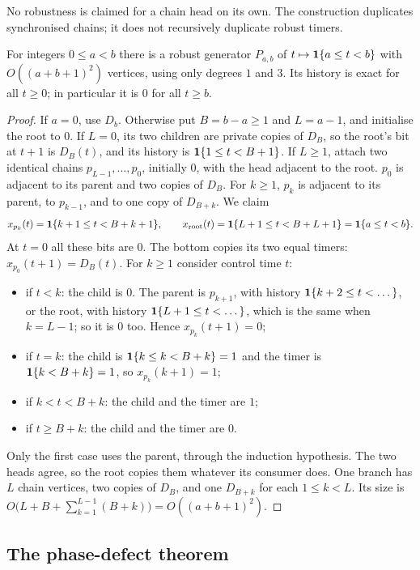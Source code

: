 No robustness is claimed for a chain head on its own. The construction duplicates synchronised
chains; it does not recursively duplicate robust timers.

\begin{lemma}[Pulses]\label{lem:pulses}
For integers $0\le a<b$ there is a robust generator $P_{a,b}$ of $t\mapsto\mathbf{1}\{a\le t<b\}$ with
$O((a+b+1)^2)$ vertices, using only degrees $1$ and $3$. Its history is exact for all $t\ge 0$; in
particular it is $0$ for all $t\ge b$.
\end{lemma}

\begin{proof}
If $a=0$, use $D_b$. Otherwise put $B=b-a\ge 1$ and $L=a-1$, and initialise the root to $0$. If
$L=0$, its two children are private copies of $D_B$, so the root's bit at $t+1$ is $D_B(t)$, and its
history is $\mathbf{1}\{1\le t<B+1\}$. If $L\ge 1$, attach two identical chains $p_{L-1},\dots,p_0$,
initially $0$, with the head adjacent to the root. $p_0$ is adjacent to its parent and two copies of
$D_B$. For $k\ge1$, $p_k$ is adjacent to its parent, to $p_{k-1}$, and to one copy of $D_{B+k}$. We
claim
\[
x_{p_k}(t)=\mathbf{1}\{k+1\le t<B+k+1\},\qquad x_{\mathrm{root}}(t)=\mathbf{1}\{L+1\le t<B+L+1\}=\mathbf{1}\{a\le t<b\}.
\]
At $t=0$ all these bits are $0$. The bottom copies its two equal timers:
$x_{p_0}(t+1)=D_B(t)$. For $k\ge 1$ consider control time $t$:
\begin{itemize}
\item if $t<k$: the child is $0$. The parent is $p_{k+1}$, with history $\mathbf{1}\{k+2\le t<\dots\}$, or
  the root, with history $\mathbf{1}\{L+1\le t<\dots\}$, which is the same when $k=L-1$; so it is $0$ too.
  Hence $x_{p_k}(t+1)=0$;
\item if $t=k$: the child is $\mathbf{1}\{k\le k<B+k\}=1$ and the timer is $\mathbf{1}\{k<B+k\}=1$, so
  $x_{p_k}(k+1)=1$;
\item if $k<t<B+k$: the child and the timer are $1$;
\item if $t\ge B+k$: the child and the timer are $0$.
\end{itemize}
Only the first case uses the parent, through the induction hypothesis. The two heads agree, so the
root copies them whatever its consumer does. One branch has $L$ chain vertices, two copies of $D_B$,
and one $D_{B+k}$ for each $1\le k<L$. Its size is
$O\bigl(L+B+\sum_{k=1}^{L-1}(B+k)\bigr)=O((a+b+1)^2)$.
\end{proof}

\subsection{The phase-defect theorem}\label{sec:generators}

